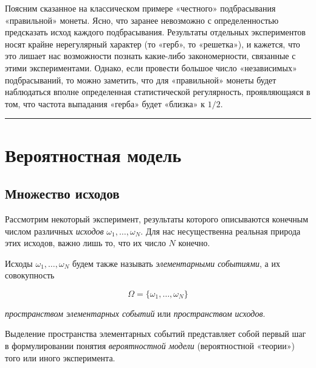 \documentclass[11pt,a4paper]{article}
\begin{document}
    Поясним сказанное на классическом примере «честного» подбрасывания
«правильной» монеты. Ясно, что заранее невозможно с определенностью
предсказать исход каждого подбрасывания. Результаты отдельных
экспериментов носят крайне нерегулярный характер (то «герб», то
«решетка»), и кажется, что это лишает нас возможности познать какие-либо
закономерности, связанные с этими экспериментами. Однако, если провести
большое число «независимых» подбрасываний, то можно заметить, что для
«правильной» монеты будет наблюдаться вполне определенная статистической
регулярность, проявляющаяся в том, что частота выпадания «герба» будет
«близка» к \(1/2\).

    \begin{center}\rule{0.5\linewidth}{\linethickness}\end{center}

    \hypertarget{ux432ux435ux440ux43eux44fux442ux43dux43eux441ux442ux43dux430ux44f-ux43cux43eux434ux435ux43bux44c}{%
\section{Вероятностная
модель}\label{ux432ux435ux440ux43eux44fux442ux43dux43eux441ux442ux43dux430ux44f-ux43cux43eux434ux435ux43bux44c}}

    \hypertarget{ux43cux43dux43eux436ux435ux441ux442ux432ux43e-ux438ux441ux445ux43eux434ux43eux432}{%
\subsection{Множество
исходов}\label{ux43cux43dux43eux436ux435ux441ux442ux432ux43e-ux438ux441ux445ux43eux434ux43eux432}}

Рассмотрим некоторый эксперимент, результаты которого описываются
конечным числом различных \emph{исходов} \(\omega_1, \dots , \omega_N\).
Для нас несущественна реальная природа этих исходов, важно лишь то, что
их число \(N\) конечно.

Исходы \(\omega_1, \dots , \omega_N\) будем также называть
\emph{элементарными событиями}, а их совокупность

\[ \Omega = \{ \omega_1, \dots , \omega_N \} \]

\emph{пространством элементарных событий} или \emph{пространством
исходов}.

Выделение пространства элементарных событий представляет собой первый
шаг в формулировании понятия \emph{вероятностной модели} (вероятностной
«теории») того или иного эксперимента.
\end{document}
